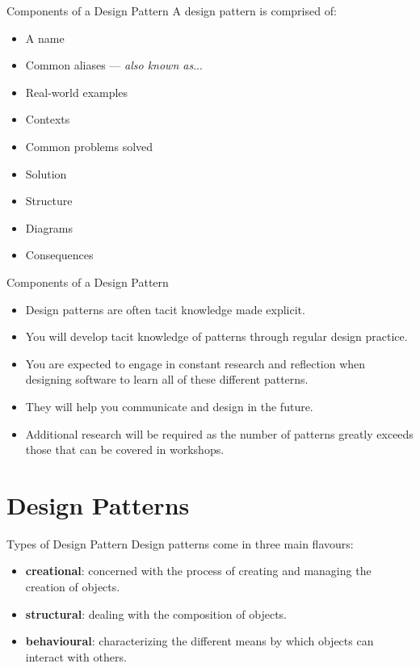 \begin{frame}{Components of a Design Pattern}
A design pattern is comprised of:

	\begin{itemize}
		\item A name
		\item Common aliases --- \textit{also known as}...	
		\item Real-world examples
		\item Contexts
		\item Common problems solved
		\item Solution
		\item Structure
		\item Diagrams
		\item Consequences
	\end{itemize}
\end{frame}

\begin{frame}{Components of a Design Pattern}
	\begin{itemize}
		\item Design patterns are often tacit knowledge made explicit.
		\item You will develop tacit knowledge of patterns through regular design practice.
		\item You are expected to engage in constant research and reflection
		when designing software to learn all of these different patterns.
		\item They will help you communicate and design in the future.
		\item Additional research will be required as the number of patterns greatly
		exceeds those that can be covered in workshops.
	\end{itemize}
\end{frame}

\part{Design Patterns}
\frame{\partpage}

\begin{frame}{Types of Design Pattern}
Design patterns come in three main flavours:

	\begin{itemize}
		\item \textbf{creational}: concerned with the process of creating and managing the creation of objects.
		\item \textbf{structural}: dealing with the composition of objects.
		\item \textbf{behavioural}: characterizing the different means by which objects can interact with others.
	\end{itemize}
\end{frame}

